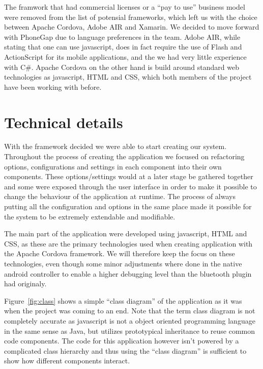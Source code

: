 	\bigskip\noindent
	The framwork that had commercial licenses or a "`pay to use"' business model were removed from the list of potensial frameworks, which left us with the choice between Apache Cordova, Adobe AIR and Xamarin.
	We decided to move forward with PhoneGap due to language preferences in the team. Adobe AIR, while stating that one can use javascript, does in fact require the use of Flash and ActionScript for its mobile applications, and the we had very little experience with C\#.
	Apache Cordova on the other hand is build around standard web technologies as javascript, HTML and CSS, which both members of the project have been working with before.
	
\section{Technical details}
With the framework decided we were able to start creating our system. 
Throughout the process of creating the application we focused on refactoring options, configurations and settings in each component into their own components. These options/settings would at a later stage be gathered together and some were exposed through the user interface in order to make it possible to change the behaviour of the application at runtime. The process of always putting all the configuration and options in the same place made it possible for the system to be extremely extendable and modifiable. 

\bigskip\noindent
The main part of the application were developed using javascript, HTML and CSS, as these are the primary technologies used when creating application with the Apache Cordova framework. We will therefore keep the focus on these technologies, even though some minor adjustments where done in the native android controller to enable a higher debugging level than the bluetooth plugin had originaly.

\bigskip\noindent
Figure~\ref{fig:class} shows a simple "`class diagram"' of the application as it was when the project was coming to an end. Note that the term class diagram is not completely accurate as javascript is not a object oriented programming language in the same sense as Java, but utilizes prototypical inheritance to reuse common code components. The code for this application however isn't powered by a complicated class hierarchy and thus using the "`class diagram"' is sufficient to show how different components interact.


